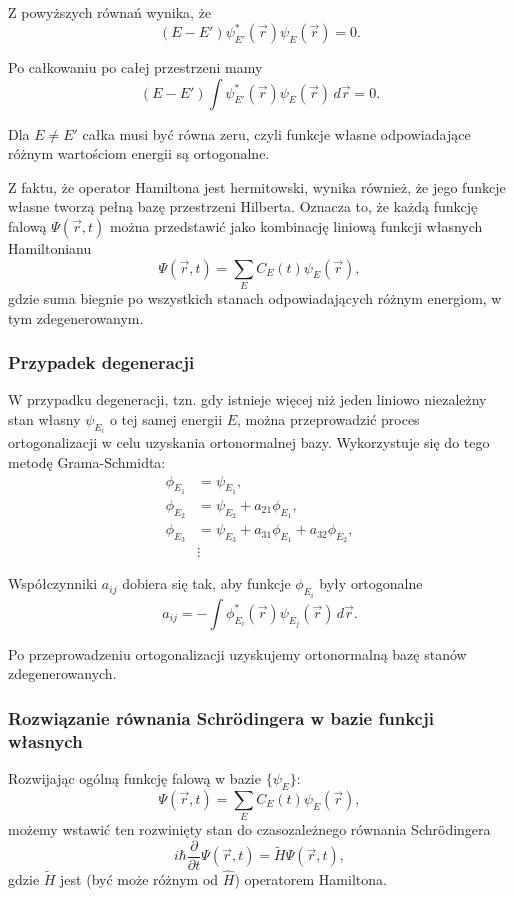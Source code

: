 Z powyższych równań wynika, że
$$
(E - E') \psi_{E'}^*(\vec{r}) \psi_E(\vec{r}) = 0.
$$

Po całkowaniu po całej przestrzeni mamy
$$
(E - E') \int \psi_{E'}^*(\vec{r}) \psi_E(\vec{r}) \, d\vec{r} = 0.
$$

Dla $E \ne E'$ całka musi być równa zeru, czyli funkcje własne odpowiadające różnym wartościom energii są ortogonalne.

Z faktu, że operator Hamiltona jest hermitowski, wynika również, że jego funkcje własne tworzą pełną bazę przestrzeni Hilberta. Oznacza to, że każdą funkcję falową $\Psi(\vec{r}, t)$ można przedstawić jako kombinację liniową funkcji własnych Hamiltonianu
$$
\Psi(\vec{r}, t) = \sum_E C_E(t) \psi_E(\vec{r}),
$$
gdzie suma biegnie po wszystkich stanach odpowiadających różnym energiom, w tym zdegenerowanym.

\subsubsection*{Przypadek degeneracji}

W przypadku degeneracji, tzn. gdy istnieje więcej niż jeden liniowo niezależny stan własny $\psi_{E_i}$ o tej samej energii $E$, można przeprowadzić proces ortogonalizacji w celu uzyskania ortonormalnej bazy. Wykorzystuje się do tego metodę Grama-Schmidta:
\begin{align*}
\phi_{E_1} &= \psi_{E_1}, \\
\phi_{E_2} &= \psi_{E_2} + a_{21} \phi_{E_1}, \\
\phi_{E_3} &= \psi_{E_3} + a_{31} \phi_{E_1} + a_{32} \phi_{E_2}, \\
&\vdots
\end{align*}

Współczynniki $a_{ij}$ dobiera się tak, aby funkcje $\phi_{E_i}$ były ortogonalne
$$
a_{ij} = -\int \phi_{E_i}^*(\vec{r}) \psi_{E_j}(\vec{r}) \, d\vec{r}.
$$

Po przeprowadzeniu ortogonalizacji uzyskujemy ortonormalną bazę stanów zdegenerowanych.

\subsubsection*{Rozwiązanie równania Schrödingera w bazie funkcji własnych}

Rozwijając ogólną funkcję falową w bazie $\{ \psi_E \}$:
$$
\Psi(\vec{r}, t) = \sum_E C_E(t) \psi_E(\vec{r}),
$$
możemy wstawić ten rozwinięty stan do czasozależnego równania Schrödingera
$$
i\hbar \frac{\partial}{\partial t} \Psi(\vec{r}, t) = \tilde{H} \Psi(\vec{r}, t),
$$
gdzie $\tilde{H}$ jest (być może różnym od $\hat{H}$) operatorem Hamiltona.

